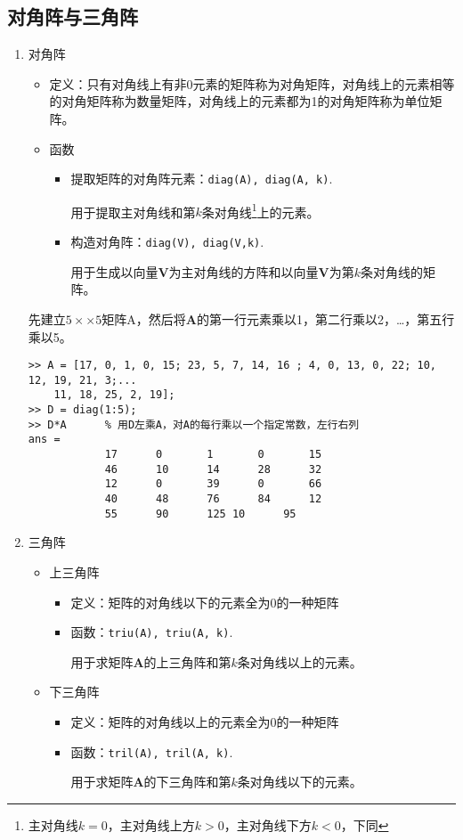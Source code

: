 \subsection{对角阵与三角阵}
\begin{enumerate}
	\item 对角阵
	\begin{itemize}
		\item 定义：只有对角线上有非0元素的矩阵称为对角矩阵，对角线上的元素相等的对角矩阵称为数量矩阵，对角线上的元素都为1的对角矩阵称为单位矩阵。
		\item 函数
		\begin{itemize}
			\item 提取矩阵的对角阵元素：\lstinline|diag(A), diag(A, k)|.
			\par \hspace*{2em}用于提取主对角线和第$k$条对角线\footnote{
				主对角线$k=0$，主对角线上方$k>0$，主对角线下方$k<0$，下同}上的元素。
			\item 构造对角阵：\lstinline|diag(V), diag(V,k)|.
			\par \hspace*{2em} 用于生成以向量$\bm{V}$为主对角线的方阵和以向量$\bm{V}$为第$k$条对角线的矩阵。
		\end{itemize}
	\end{itemize}

\examples 先建立$5× \times 5 $矩阵A，然后将$\bm{A}$的第一行元素乘以1，第二行乘以2，…，第五行乘以5。\vspace*{1em}

\begin{lstlisting}
>> A = [17, 0, 1, 0, 15; 23, 5, 7, 14, 16 ; 4, 0, 13, 0, 22; 10, 12, 19, 21, 3;...
	11, 18, 25, 2, 19];
>> D = diag(1:5);
>> D*A		% 用D左乘A，对A的每行乘以一个指定常数，左行右列
ans =
			17		0		1		0		15
			46		10		14		28		32
			12		0		39		0		66
			40		48		76		84		12
			55		90		125	10		95
\end{lstlisting}
\item 三角阵
\begin{itemize}
	\item 上三角阵
	\begin{itemize}
		\item 定义：矩阵的对角线以下的元素全为0的一种矩阵
		\item 函数：\lstinline|triu(A), triu(A, k)|.
		\par \hspace*{2em} 用于求矩阵$\bm{A}$的上三角阵和第$k$条对角线以上的元素。
	\end{itemize}
	\item 下三角阵
	\begin{itemize}
		\item 定义：矩阵的对角线以上的元素全为0的一种矩阵
		\item 函数：\lstinline|tril(A), tril(A, k)|.
		\par \hspace*{2em} 用于求矩阵$\bm{A}$的下三角阵和第$k$条对角线以下的元素。
	\end{itemize}
\end{itemize}
\end{enumerate}

